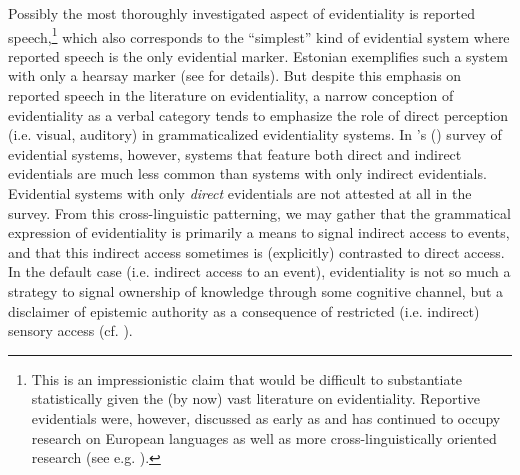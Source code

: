 \documentclass[output=paper]{langsci/langscibook}
\begin{document}
Possibly the most thoroughly investigated aspect of evidentiality is reported speech,\footnote{This is an impressionistic claim that would be difficult to substantiate statistically given the (by now) vast literature on evidentiality. Reportive evidentials were, however, discussed as early as \cite{Jakobson1957} and has continued to occupy research on European languages as well as more cross-linguistically oriented research (see e.g. \citealt{Boye2012}).} which also corresponds to the “simplest” kind of evidential system where reported speech is the only evidential marker. Estonian exemplifies such a system with only a hearsay marker (see \citealt{Aikhenvald2004} for details). But despite this emphasis on reported speech in the literature on evidentiality, a narrow conception of evidentiality as a verbal category tends to emphasize the role of direct perception (i.e. visual, auditory) in grammaticalized evidentiality systems. In \citeauthor{Haan2013}’s (\citeyear{Haan2013}) survey of evidential systems, however, systems that feature both direct and indirect evidentials are much less common than systems with only indirect evidentials. Evidential systems with only \emph{direct} evidentials are not attested at all in the survey. From this cross-linguistic patterning, we may gather that the grammatical expression of evidentiality is primarily a means to signal indirect access to events, and that this indirect access sometimes is (explicitly) contrasted to direct access. In the default case (i.e. indirect access to an event), evidentiality is not so much a strategy to signal ownership of knowledge through some cognitive channel, but a disclaimer of epistemic authority as a consequence of restricted (i.e. indirect) sensory access (cf. \citealt{Mushin2001}). 
\end{document}
